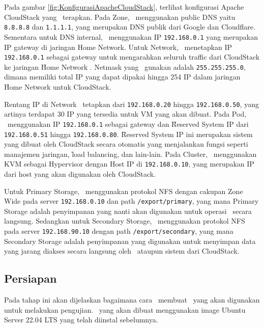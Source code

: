 Pada gambar \ref{fig:KonfigurasiApacheCloudStack}, terlihat konfigurasi Apache CloudStack yang \saya\ terapkan. Pada Zone, \saya\ menggunakan public DNS yaitu \texttt{8.8.8.8} dan \texttt{1.1.1.1}, yang merupakan DNS publik dari Google dan Cloudflare. Sementara untuk DNS internal, \saya\ menggunakan IP \texttt{192.168.0.1} yang merupakan IP gateway di jaringan Home Network. Untuk Network, \saya\ menetapkan IP \texttt{192.168.0.1} sebagai gateway untuk mengarahkan seluruh traffic dari CloudStack ke jaringan \f{Home Network} \saya. Netmask yang \saya\ gunakan adalah \texttt{255.255.255.0}, dimana memiliki total IP yang dapat dipakai hingga 254 IP dalam jaringan \f{Home Network} untuk CloudStack.

Rentang IP di Network \saya\ tetapkan dari \texttt{192.168.0.20} hingga \texttt{192.168.0.50}, yang artinya terdapat 30 IP yang tersedia untuk VM yang akan dibuat. Pada Pod, \saya\ menggunakan IP \texttt{192.168.0.1} sebagai gateway dan \f{Reserved System IP} dari \texttt{192.168.0.51} hingga \texttt{192.168.0.80}. \f{Reserved System IP} ini merupakan sistem yang dibuat oleh CloudStack secara otomatis yang menjalankan fungsi seperti manajemen jaringan, \f{load balancing}, dan lain-lain. Pada Cluster, \saya\ menggunakan KVM sebagai Hypervisor dengan Host IP di \texttt{192.168.0.10}, yang merupakan IP dari host yang akan digunakan oleh CloudStack.

Untuk Primary Storage, \saya\ menggunakan protokol NFS dengan cakupan Zone Wide pada server \texttt{192.168.0.10} dan path \texttt{/export/primary}, yang mana Primary Storage adalah penyimpanan yang nanti akan digunakan untuk operasi \vm\ secara langsung. Sedangkan untuk Secondary Storage, \saya\ menggunakan protokol NFS pada server \texttt{192.168.90.10} dengan path \texttt{/export/secondary}, yang mana Secondary Storage adalah penyimpanan yang digunakan untuk menyimpan data yang jarang diakses secara langsung oleh \vm\ ataupun sistem dari CloudStack.

\subsection{Persiapan \vm}
Pada tahap ini akan dijelaskan bagaimana cara \saya\ membuat \vm\ yang akan digunakan untuk melakukan pengujian. \vm\ yang akan dibuat menggunakan image Ubuntu Server 22.04 LTS yang telah diinstal sebelumnya.

